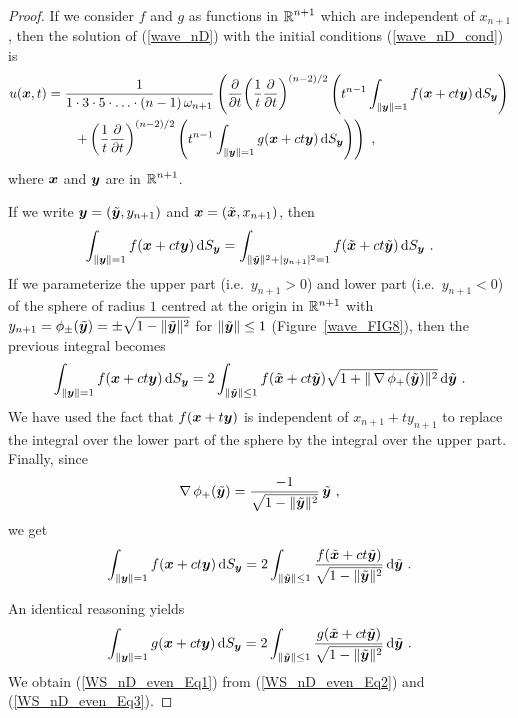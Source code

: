 \begin{proof}
If we consider $f$ and $g$ as functions in $\DS \RR^{n+1}$ which are
independent of $x_{n+1}$, then the solution of (\ref{wave_nD}) with
the initial conditions (\ref{wave_nD_cond}) is 
\begin{equation} \label{WS_nD_even_Eq1}
\begin{split}
u(\VEC{x},t) &= \frac{1}{1\cdot 3 \cdot 5 \cdot \ldots \cdot (n-1)
\,\omega_{n+1}}
\left( \pdfdx{ \left( \frac{1}{t} \pdydx{}{t} \right)^{(n-2)/2} }{t}
\left( t^{n-1} \int_{\|\VEC{y}\|=1} f(\VEC{x} + ct \VEC{y})
\dss{S}{y} \right)  \right. \\
&\qquad \left. + \left( \frac{1}{t} \pdydx{}{t} \right)^{(n-2)/2}
\left( t^{n-1} \int_{\|\VEC{y}\|=1} g(\VEC{x}+ ct \VEC{y})
\dss{S}{y} \right) \right) \ ,
\end{split}
\end{equation}
where $\VEC{x}$ and $\VEC{y}$ are in $\DS \RR^{n+1}$.

If we write $\VEC{y} = (\tilde{\VEC{y}}, y_{n+1})$ and
$\VEC{x} = (\tilde{\VEC{x}}, x_{n+1})$, then
\[
\int_{\|\VEC{y}\|=1} f(\VEC{x} + ct \VEC{y}) \dss{S}{y}
= \int_{\|\tilde{\VEC{y}}\|^2+|y_{n+1}|^2=1}
f(\tilde{\VEC{x}}+ ct \tilde{\VEC{y}}) \dss{S}{y} \ .
\]
If we parameterize the upper part (i.e.\ $y_{n+1}>0$) and lower part
(i.e.\ $y_{n+1}<0$) of the sphere of radius $1$ centred at the origin
in $\RR^{n+1}$ with $\DS y_{n+1} = \phi_{\pm}(\tilde{\VEC{y}}) =
\pm \sqrt{1-\|\tilde{\VEC{y}}\|^2}$ for $\|\tilde{\VEC{y}}\|\leq 1$
(Figure~\ref{wave_FIG8}), then the previous integral becomes
\[
\int_{\|\VEC{y}\|=1} f(\VEC{x} + ct \VEC{y}) \dss{S}{y}
= 2\int_{\|\tilde{\VEC{y}}\|\leq 1}
f(\tilde{\VEC{x}} + ct \tilde{\VEC{y}})
\sqrt{1+\|\graD \phi_+(\tilde{\VEC{y}})\|^2} \dx{\tilde{\VEC{y}}} \ .
\]
We have used the fact that $f(\VEC{x}+t\VEC{y})$ is independent of
$x_{n+1}+ty_{n+1}$ to replace the integral over the lower part of the
sphere by the integral over the upper part.  Finally, since
\[
\graD \phi_+(\tilde{\VEC{y}}) =
\frac{-1}{\sqrt{1-\|\tilde{\VEC{y}}\|^2}}\,\tilde{\VEC{y}} \ ,
\]
we get
\begin{equation} \label{WS_nD_even_Eq2}
\int_{\|\VEC{y}\|=1} f(\VEC{x} + ct \VEC{y}) \dss{S}{y}
= 2\int_{\|\tilde{\VEC{y}}\|\leq 1}
\frac{ f(\tilde{\VEC{x}} + ct \tilde{\VEC{y}}) }
{\sqrt{1-\|\tilde{\VEC{y}}\|^2}} \dx{\tilde{\VEC{y}}} \ .
\end{equation}

An identical reasoning yields
\begin{equation} \label{WS_nD_even_Eq3}
\int_{\|\VEC{y}\|=1} g(\VEC{x} + ct \VEC{y}) \dss{S}{y}
= 2\int_{\|\tilde{\VEC{y}}\|\leq 1}
\frac{ g(\tilde{\VEC{x}} + ct \tilde{\VEC{y}}) }
{\sqrt{1-\|\tilde{\VEC{y}}\|^2}} \dx{\tilde{\VEC{y}}} \ .
\end{equation}
We obtain (\ref{WS_nD_even_Eq1}) from (\ref{WS_nD_even_Eq2}) and
(\ref{WS_nD_even_Eq3}).
\end{proof}

